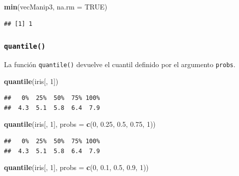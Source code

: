 \documentclass[
]{book}
\newenvironment{Shaded}{\begin{snugshade}}{\end{snugshade}}
\newcommand{\DataTypeTok}[1]{\textcolor[rgb]{0.13,0.29,0.53}{#1}}
\newcommand{\DecValTok}[1]{\textcolor[rgb]{0.00,0.00,0.81}{#1}}
\newcommand{\FloatTok}[1]{\textcolor[rgb]{0.00,0.00,0.81}{#1}}
\newcommand{\KeywordTok}[1]{\textcolor[rgb]{0.13,0.29,0.53}{\textbf{#1}}}
\newcommand{\NormalTok}[1]{#1}
\newcommand{\OtherTok}[1]{\textcolor[rgb]{0.56,0.35,0.01}{#1}}
\begin{document}
\begin{Shaded}
\begin{Highlighting}[]
\KeywordTok{min}\NormalTok{(vecManip3, }\DataTypeTok{na.rm =} \OtherTok{TRUE}\NormalTok{)}
\end{Highlighting}
\end{Shaded}

\begin{verbatim}
## [1] 1
\end{verbatim}

\hypertarget{l015quantile}{%
\subsubsection{\texorpdfstring{\texttt{quantile()}}{quantile()}}\label{l015quantile}}

La función \texttt{quantile()} devuelve el cuantil definido por el argumento \texttt{probs}.

\begin{Shaded}
\begin{Highlighting}[]
\KeywordTok{quantile}\NormalTok{(iris[, }\DecValTok{1}\NormalTok{])}
\end{Highlighting}
\end{Shaded}

\begin{verbatim}
##   0%  25%  50%  75% 100% 
##  4.3  5.1  5.8  6.4  7.9
\end{verbatim}

\begin{Shaded}
\begin{Highlighting}[]
\KeywordTok{quantile}\NormalTok{(iris[, }\DecValTok{1}\NormalTok{], }\DataTypeTok{probs =} \KeywordTok{c}\NormalTok{(}\DecValTok{0}\NormalTok{, }\FloatTok{0.25}\NormalTok{, }\FloatTok{0.5}\NormalTok{, }\FloatTok{0.75}\NormalTok{, }\DecValTok{1}\NormalTok{))}
\end{Highlighting}
\end{Shaded}

\begin{verbatim}
##   0%  25%  50%  75% 100% 
##  4.3  5.1  5.8  6.4  7.9
\end{verbatim}

\begin{Shaded}
\begin{Highlighting}[]
\KeywordTok{quantile}\NormalTok{(iris[, }\DecValTok{1}\NormalTok{], }\DataTypeTok{probs =} \KeywordTok{c}\NormalTok{(}\DecValTok{0}\NormalTok{, }\FloatTok{0.1}\NormalTok{, }\FloatTok{0.5}\NormalTok{, }\FloatTok{0.9}\NormalTok{, }\DecValTok{1}\NormalTok{))}
\end{Highlighting}
\end{Shaded}
\end{document}
